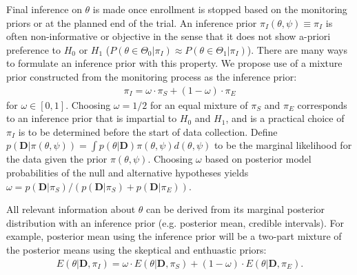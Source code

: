 \documentclass[12pt]{article}
\begin{document}


Final inference on $\theta$ is made once enrollment is stopped based on the monitoring priors or at the planned end of the trial. An inference prior $\pi_{I}(\theta,\psi)\equiv\pi_{I}$ is often non-informative or objective in the sense that it does not show a-priori preference to $H_0$ or $H_1$ ($P(\theta\in\Theta_0|\pi_I)\approx P(\theta\in\Theta_1|\pi_I)$). There are many ways to formulate an inference prior with this property. We propose use of a mixture prior constructed from the monitoring process as the inference prior:
\begin{align*}
\pi_{I}=\omega\cdot\pi_{S}+(1-\omega)\cdot\pi_E
\end{align*}
for $\omega\in[0,1]$. Choosing $\omega=1/2$ for an equal mixture of $\pi_S$ and $\pi_E$ corresponds to an inference prior that is impartial to $H_0$ and $H_1$, and is a practical choice of $\pi_I$ is to be determined before the start of data collection. Define $p(\mathbf{D}|\pi(\theta,\psi))=\int p(\theta|\mathbf{D})\pi(\theta,\psi)d(\theta,\psi)$ to be the marginal likelihood for the data given the prior $\pi(\theta,\psi)$. Choosing $\omega$ based on posterior model probabilities of the null and alternative hypotheses yields $\omega=p(\mathbf{D}| \pi_{S})/(p(\mathbf{D}| \pi_{S})+p(\mathbf{D}| \pi_{E}))$. 

All relevant information about $\theta$ can be derived from its marginal posterior distribution with an inference prior (e.g. posterior mean, credible intervals). For example, posterior mean using the inference prior will be a two-part mixture of the posterior means using the skeptical and enthuastic priors:
\begin{align*}
E(\theta|\mathbf{D},\pi_{I})=\omega\cdot E(\theta|\mathbf{D}, \pi_{S})+(1-\omega)\cdot E(\theta|\mathbf{D}, \pi_{E}).
\end{align*}
\end{document}

